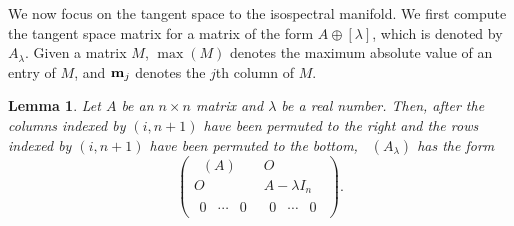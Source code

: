 \documentclass[11pt]{article}
\def\red{\color{red}}
\newtheorem{lem}[thm]{Lemma}
\theoremstyle{definition}
\theoremstyle{definition}
\theoremstyle{definition}
\DeclareMathOperator{\TS}{TS_S}
\DeclareMathOperator{\TSS}{TS_S}
\newcommand{\bm}{{\bf m}}
\newcommand{\x}{\times}
\newcommand{\mei}{\mathcal{E}} %
\begin{document}







We now focus on the  tangent space to the isospectral manifold. 
We first compute  the tangent space matrix for a matrix of the form $A \oplus [\lambda]$, which is denoted by $A_{\lambda}$.
Given a matrix $M$, $\max(M)$ denotes the maximum absolute value of an entry of $M$, and 
 $\bm_j$ denotes the $j$th column of $M$.


\begin{lem}
\label{TS-sum}
Let $A$ be an $n\times n$ matrix and $\lambda$ be a real number.
Then,  after the columns indexed by $(i,n+1)$ have been permuted to the right and the rows indexed by $(i,n+1)$ have been permuted to the bottom, $\TS(A_{\lambda})$
has the form
 \[
\left( \begin{array}{c|c}
\TS(A) & O \\ \hline
O & A   -\lambda I_n 
\\ \hline
\begin{array}{ccc} 0 & \cdots & 0 \end{array} & \begin{array}{ccc} 0 & \cdots & 0 \end{array} 
 \end{array} 
\right).
\]
\end{lem}
\end{document}
